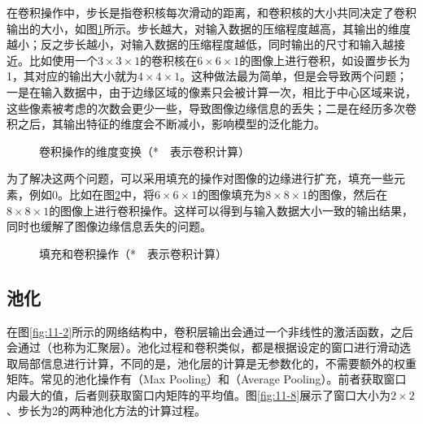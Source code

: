 \parinterval 在卷积操作中，步长是指卷积核每次滑动的距离，和卷积核的大小共同决定了卷积输出的大小，如图\ref{fig:11-6}所示。步长越大，对输入数据的压缩程度越高，其输出的维度越小；反之步长越小，对输入数据的压缩程度越低，同时输出的尺寸和输入越接近。比如使用一个$3 \times 3 \times 1$的卷积核在$6 \times 6 \times 1$的图像上进行卷积，如设置步长为1，其对应的输出大小就为$4 \times 4 \times 1$。这种做法最为简单，但是会导致两个问题；一是在输入数据中，由于边缘区域的像素只会被计算一次，相比于中心区域来说，这些像素被考虑的次数会更少一些，导致图像边缘信息的丢失；二是在经历多次卷积之后，其输出特征的维度会不断减小，影响模型的泛化能力。

\begin{figure}[htp]
\centering

\caption{卷积操作的维度变换（*\ \ 表示卷积计算）}
\label{fig:11-6}
\end{figure}

\parinterval 为了解决这两个问题，可以采用填充的操作对图像的边缘进行扩充，填充一些元素，例如0。比如在图\ref{fig:11-7}中，将$6 \times 6 \times 1$的图像填充为$8 \times 8 \times 1$的图像，然后在$8 \times 8 \times 1$的图像上进行卷积操作。这样可以得到与输入数据大小一致的输出结果，同时也缓解了图像边缘信息丢失的问题。

\begin{figure}[htp]
\centering

\caption{填充和卷积操作（*\ \ 表示卷积计算）}
\label{fig:11-7}
\end{figure}

\vspace{-2em}
\subsection{池化}

\parinterval 在图\ref{fig:11-2}所示的网络结构中，卷积层输出会通过一个非线性的激活函数，之后会通过{\small{}}（也称为汇聚层）。池化过程和卷积类似，都是根据设定的窗口进行滑动选取局部信息进行计算，不同的是，池化层的计算是无参数化的，不需要额外的权重矩阵。常见的池化操作有{\small{}}（Max Pooling）和{\small{}}（Average Pooling）。前者获取窗口内最大的值，后者则获取窗口内矩阵的平均值。图\ref{fig:11-8}展示了窗口大小为$2 \times 2$、步长为2的两种池化方法的计算过程。

